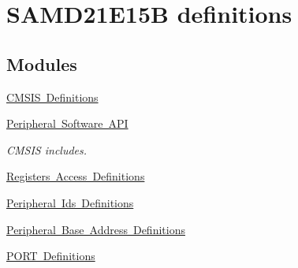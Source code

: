 \hypertarget{group___s_a_m_d21_e15_b__definitions}{}\section{S\+A\+M\+D21\+E15B definitions}
\label{group___s_a_m_d21_e15_b__definitions}
\subsection*{Modules}
\begin{DoxyCompactItemize}
\item 
\mbox{\hyperlink{group___s_a_m_d21_e15_b__cmsis}{C\+M\+S\+I\+S Definitions}}
\item 
\mbox{\hyperlink{group___s_a_m_d21_e15_b__api}{Peripheral Software A\+PI}}
\begin{DoxyCompactList}\small\item\em C\+M\+S\+IS includes. \end{DoxyCompactList}\item 
\mbox{\hyperlink{group___s_a_m_d21_e15_b__reg}{Registers Access Definitions}}
\item 
\mbox{\hyperlink{group___s_a_m_d21_e15_b__id}{Peripheral Ids Definitions}}
\item 
\mbox{\hyperlink{group___s_a_m_d21_e15_b__base}{Peripheral Base Address Definitions}}
\item 
\mbox{\hyperlink{group___s_a_m_d21_e15_b__port}{P\+O\+R\+T Definitions}}
\end{DoxyCompactItemize}
